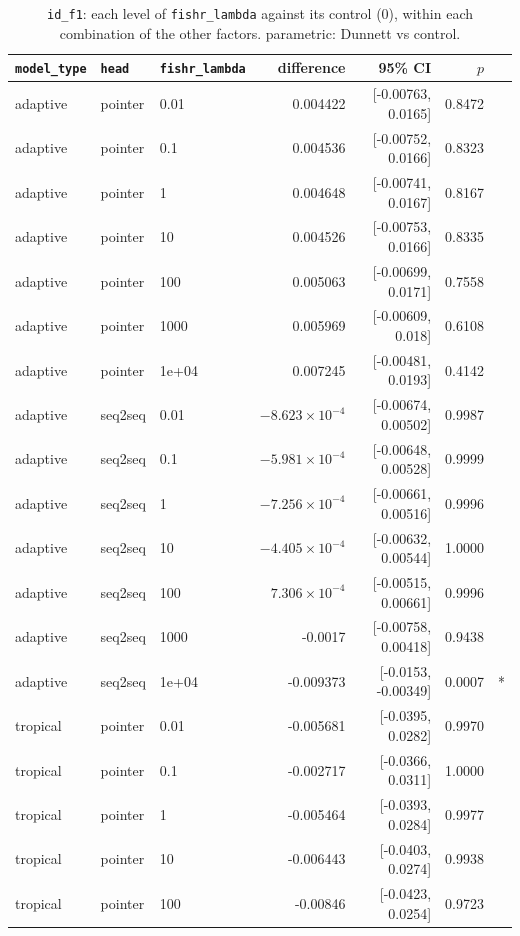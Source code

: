 \documentclass[10pt]{article}
\begin{document}
{\small
\begin{longtable}{lllrrrl}
\caption{\texttt{id\_f1}: each level of \texttt{fishr\_lambda} against its control (0), within each combination of the other factors. parametric: Dunnett vs control.}\label{tab:control-id_f1}\\
\toprule
\texttt{model\_type} & \texttt{head} & \texttt{fishr\_lambda} & difference & 95\% CI & $p$ & \\
\midrule
\endhead
adaptive & pointer & 0.01 & 0.004422 & [-0.00763, 0.0165] & 0.8472 & \\
adaptive & pointer & 0.1 & 0.004536 & [-0.00752, 0.0166] & 0.8323 & \\
adaptive & pointer & 1 & 0.004648 & [-0.00741, 0.0167] & 0.8167 & \\
adaptive & pointer & 10 & 0.004526 & [-0.00753, 0.0166] & 0.8335 & \\
adaptive & pointer & 100 & 0.005063 & [-0.00699, 0.0171] & 0.7558 & \\
adaptive & pointer & 1000 & 0.005969 & [-0.00609, 0.018] & 0.6108 & \\
adaptive & pointer & 1e+04 & 0.007245 & [-0.00481, 0.0193] & 0.4142 & \\
adaptive & seq2seq & 0.01 & $-8.623\times10^{-4}$ & [-0.00674, 0.00502] & 0.9987 & \\
adaptive & seq2seq & 0.1 & $-5.981\times10^{-4}$ & [-0.00648, 0.00528] & 0.9999 & \\
adaptive & seq2seq & 1 & $-7.256\times10^{-4}$ & [-0.00661, 0.00516] & 0.9996 & \\
adaptive & seq2seq & 10 & $-4.405\times10^{-4}$ & [-0.00632, 0.00544] & 1.0000 & \\
adaptive & seq2seq & 100 & $7.306\times10^{-4}$ & [-0.00515, 0.00661] & 0.9996 & \\
adaptive & seq2seq & 1000 & -0.0017 & [-0.00758, 0.00418] & 0.9438 & \\
adaptive & seq2seq & 1e+04 & -0.009373 & [-0.0153, -0.00349] & 0.0007 & *\\
tropical & pointer & 0.01 & -0.005681 & [-0.0395, 0.0282] & 0.9970 & \\
tropical & pointer & 0.1 & -0.002717 & [-0.0366, 0.0311] & 1.0000 & \\
tropical & pointer & 1 & -0.005464 & [-0.0393, 0.0284] & 0.9977 & \\
tropical & pointer & 10 & -0.006443 & [-0.0403, 0.0274] & 0.9938 & \\
tropical & pointer & 100 & -0.00846 & [-0.0423, 0.0254] & 0.9723 & \\

\end{longtable}}
\end{document}
